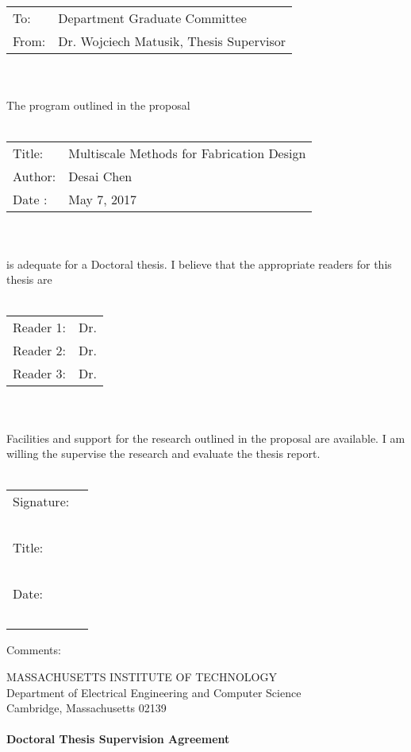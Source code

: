 \documentclass[11pt]{article}
\begin{document}
\begin{tabular}{p{2cm} p{10cm}}
	To: & Department Graduate Committee \\
	From: & Dr. Wojciech Matusik, Thesis Supervisor
\end{tabular}\\~\\
The program outlined in the proposal\\~\\
\begin{tabular}{p{2cm} l}
	Title: & Multiscale Methods for Fabrication Design\\
	Author: & Desai Chen\\
	Date : & May 7, 2017
\end{tabular}\\~\\
is adequate for a Doctoral thesis. I believe that the appropriate readers for this thesis are\\~\\
\begin{tabular}{p{2cm} l}
	Reader 1: & Dr.\\
	Reader 2: & Dr.\\
	Reader 3: & Dr.
\end{tabular}\\~\\
Facilities and support for the research outlined in the proposal are available.
I am willing the supervise the research and evaluate the thesis report.\\~\\
\begin{flushright}
	\begin{tabular}{l l}
		Signature: & \underline{\hspace{6cm}}\\~\\
		Title: & \underline{\hspace{6cm}}\\~\\
		Date: & \underline{\hspace{6cm}}\\~\\
	\end{tabular}
\end{flushright}
Comments:
\newpage
\begin{center}
	MASSACHUSETTS INSTITUTE OF TECHNOLOGY\\
	Department of Electrical Engineering and Computer Science\\
	Cambridge, Massachusetts 02139\\~\\
	\textbf{Doctoral Thesis Supervision Agreement}\\~\\
\end{center}
\end{document}
